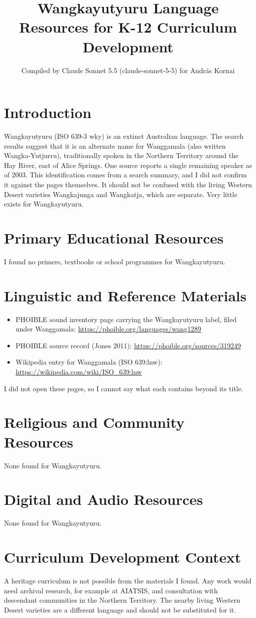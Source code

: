 \documentclass[12pt]{article}
\title{Wangkayutyuru Language Resources for K-12 Curriculum Development}
\author{Compiled by Claude Sonnet 5.5 (claude-sonnet-5-5) for Andr\'as Kornai}
\date{}
\begin{document}
\maketitle

\section{Introduction}
Wangkayutyuru (ISO 639-3 wky) is an extinct Australian language. The search results suggest that it is an alternate name for Wanggamala (also written Wangka-Yutjurru), traditionally spoken in the Northern Territory around the Hay River, east of Alice Springs. One source reports a single remaining speaker as of 2003. This identification comes from a search summary, and I did not confirm it against the pages themselves. It should not be confused with the living Western Desert varieties Wangkajunga and Wangkatja, which are separate. Very little exists for Wangkayutyuru.

\section{Primary Educational Resources}
I found no primers, textbooks or school programmes for Wangkayutyuru.

\section{Linguistic and Reference Materials}
\begin{itemize}
\item PHOIBLE sound inventory page carrying the Wangkayutyuru label, filed under Wanggamala: \url{https://phoible.org/languages/wang1289}
\item PHOIBLE source record (Jones 2011): \url{https://phoible.org/sources/319249}
\item Wikipedia entry for Wanggamala (ISO 639:lnw): \url{https://wikipedia.com/wiki/ISO_639:lnw}
\end{itemize}
I did not open these pages, so I cannot say what each contains beyond its title.

\section{Religious and Community Resources}
None found for Wangkayutyuru.

\section{Digital and Audio Resources}
None found for Wangkayutyuru.

\section{Curriculum Development Context}
A heritage curriculum is not possible from the materials I found. Any work would need archival research, for example at AIATSIS, and consultation with descendant communities in the Northern Territory. The nearby living Western Desert varieties are a different language and should not be substituted for it.
\end{document}
